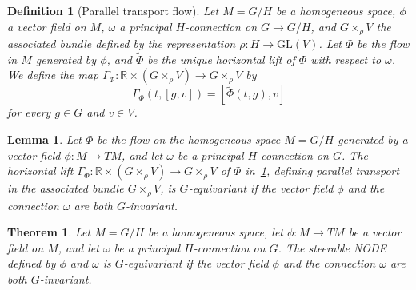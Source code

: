 \documentclass[10pt,a4paper]{amsart}
\newtheorem{definition}{Definition}
\newtheorem{lemma}{Lemma}
\newtheorem{theorem}{Theorem}
\newcommand{\R}{\mathbb{R}}
\begin{document}
\begin{definition}[Parallel transport flow]\label{dfn:flow_ass_bundle}
    Let $M=G/H$ be a homogeneous space, $\phi$ a vector field on $M$, $\omega$ a principal $H$-connection on $G\to G/H$, and $G\times_{\rho} V$ the associated bundle defined by the representation $\rho: H \to \mathrm{GL}(V)$. Let $\Phi$ be the flow in $M$ generated by $\phi$, and $\tilde{\Phi}$ be the unique horizontal lift of $\Phi$ with respect to $\omega$. We define the map $\Gamma_{\Phi}:\R \times (G \times_{\rho} V) \to G \times_{\rho} V$ by
    \begin{equation}
        \Gamma_{\Phi}(t,[g,v]) = [\tilde{\Phi}(t,g),v]
    \end{equation}
    for every $g \in G$ and $v \in V$.
\end{definition}

\begin{lemma}\label{lem:equiv_lift_ass}
    Let $\Phi$ be the flow on the homogeneous space $M=G/H$ generated by a vector field $\phi: M \to TM$, and let $\omega$ be a principal $H$-connection on $G$. The horizontal lift $\Gamma_{\Phi}: \R \times (G \times_{\rho} V) \to G \times_{\rho} V$ of $\Phi$ in~\cref{dfn:flow_ass_bundle}, defining parallel transport in the associated bundle $G \times_{\rho} V$, is $G$-equivariant if the vector field $\phi$ and the connection $\omega$ are both $G$-invariant.
\end{lemma}

\begin{theorem}\label{thm:equivariance_steerable_NODE_flow}
    Let $M=G/H$ be a homogeneous space, let $\phi: M \to TM$ be a vector field on $M$, and let $\omega$ be a principal $H$-connection on $G$. The steerable NODE defined by $\phi$ and $\omega$ is $G$-equivariant if the vector field $\phi$ and the connection $\omega$ are both $G$-invariant.
\end{theorem}
\end{document}
